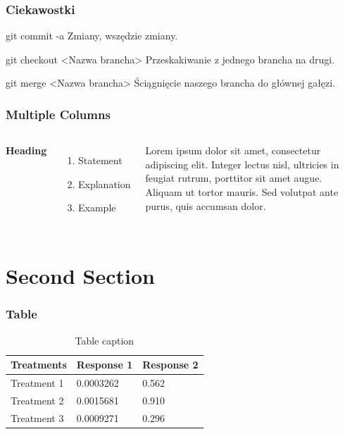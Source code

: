 \documentclass[9pt]{beamer}
\begin{document}
	\begin{frame}
		\frametitle{Ciekawostki}

			\begin{block}{git commit -a}
				Zmiany, wszędzie zmiany.
			\end{block}

			\begin{block}{git checkout <Nazwa brancha>}
				Przeskakiwanie z jednego brancha na drugi.
			\end{block}	

			\begin{block}{git merge <Nazwa brancha>}
				Ściągnięcie naszego brancha do głównej gałęzi.
			\end{block}	
			
					
						
	\end{frame}



	
	\begin{frame}
	\frametitle{Multiple Columns}
	\begin{columns}[c] %

	\textbf{Heading}
	\begin{enumerate}
	\item Statement
	\item Explanation
	\item Example
	\end{enumerate}

	Lorem ipsum dolor sit amet, consectetur adipiscing elit. Integer lectus nisl, ultricies in feugiat rutrum, porttitor sit amet augue. Aliquam ut tortor mauris. Sed volutpat ante purus, quis accumsan dolor.

	\end{columns}
	\end{frame}

	\section{Second Section}

	\begin{frame}
	\frametitle{Table}
	\begin{table}
	\begin{tabular}{l l l}
	\toprule
	\textbf{Treatments} & \textbf{Response 1} & \textbf{Response 2}\\
	\midrule
	Treatment 1 & 0.0003262 & 0.562 \\
	Treatment 2 & 0.0015681 & 0.910 \\
	Treatment 3 & 0.0009271 & 0.296 \\
	\bottomrule
	\end{tabular}
	\caption{Table caption}
	\end{table}
	\end{frame}
\end{document}
